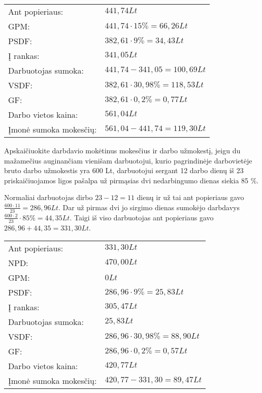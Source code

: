\begin{tasks}
\begin{task}
\begin{solution}
      \begin{tabularx}{15cm}{p{7.5cm}|p{7.5cm}}
        Ant popieriaus: & $441,74Lt$ \\
        GPM: & $441,74 \cdot 15\% = 66,26Lt$ \\
        PSDF: & $382,61 \cdot 9\% = 34,43Lt$ \\
        Į rankas: & $341,05Lt$ \\
        Darbuotojas sumoka: & $441,74 - 341,05 = 100,69Lt$ \\
        VSDF: & $382,61 \cdot 30,98\% = 118,53Lt$ \\
        GF: & $382,61 \cdot 0,2\% = 0,77Lt$ \\
        Darbo vietos kaina: & $561,04Lt$ \\
        Įmonė sumoka mokesčių: & $561,04 - 441,74 = 119,30Lt$ \\
      \end{tabularx}

    \end{solution}
  \end{task}

  \begin{task}
    \begin{condition}
      Apskaičiuokite darbdavio mokėtinus mokesčius ir darbo
      užmokestį, jeigu du mažamečius auginančiam vienišam
      darbuotojui, kurio pagrindinėje darbovietėje bruto darbo
      užmokestis yra 600 Lt, darbuotojui sergant 12 darbo dienų iš 23
      priskaičiuojamos ligos pašalpa už pirmąsias dvi nedarbingumo
      dienas siekia 85 \%.
    \end{condition}
    \begin{solution}
      Normaliai darbuotojas dirbo $23 - 12 = 11$ dienų ir už tai
      ant popieriaus gavo $\frac{600 \cdot 11}{23} = 286,96 Lt$.
      Dar už pirmas dvi jo sirgimo dienas sumokėjo darbdavys
      $\frac{600 \cdot 2}{23} \cdot 85\% = 44,35 Lt$.
      Taigi iš viso darbuotojas ant popieriaus gavo
      $286,96 + 44,35 = 331,30 Lt$.

      \begin{tabularx}{15cm}{p{7.5cm}|p{7.5cm}}
        Ant popieriaus: & $331,30Lt$ \\
        NPD: & $470,00Lt$ \\
        GPM: & $0Lt$ \\
        PSDF: & $286,96 \cdot 9\% = 25,83Lt$ \\
        Į rankas: & $305,47Lt$ \\
        Darbuotojas sumoka: & $25,83Lt$ \\
        VSDF: & $286,96 \cdot 30,98\% = 88,90Lt$ \\
        GF: & $286,96 \cdot 0,2\% = 0,57Lt$ \\
        Darbo vietos kaina: & $420,77Lt$ \\
        Įmonė sumoka mokesčių: & $420,77 - 331,30 = 89,47Lt$ \\
      \end{tabularx}


\end{solution}
\end{task}
\end{tasks}
